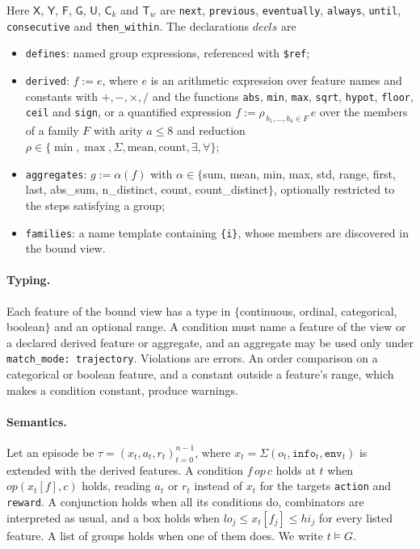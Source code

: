 \documentclass{article}
\begin{document}
Here $\mathsf{X}$, $\mathsf{Y}$, $\mathsf{F}$, $\mathsf{G}$, $\mathsf{U}$,
$\mathsf{C}_k$ and $\mathsf{T}_w$ are \texttt{next}, \texttt{previous},
\texttt{eventually}, \texttt{always}, \texttt{until}, \texttt{consecutive}
and \texttt{then\_within}. The declarations $\mathit{decls}$ are
\begin{itemize}
\item \texttt{defines}: named group expressions, referenced with \texttt{\$ref};
\item \texttt{derived}: $f := e$, where $e$ is an arithmetic expression
over feature names and constants with $+,-,\times,/$ and the functions
\texttt{abs}, \texttt{min}, \texttt{max}, \texttt{sqrt}, \texttt{hypot},
\texttt{floor}, \texttt{ceil} and \texttt{sign}, or a quantified
expression $f := \rho_{\,b_1,\dots,b_a\in F}\,e$ over the members of a
family $F$ with arity $a\le 8$ and reduction
$\rho\in\{\min,\max,\Sigma,\text{mean},\text{count},\exists,\forall\}$;
\item \texttt{aggregates}: $g := \alpha(f)$ with
$\alpha\in\{$sum, mean, min, max, std, range, first, last, abs\_sum,
n\_distinct, count, count\_distinct$\}$, optionally restricted to the
steps satisfying a group;
\item \texttt{families}: a name template containing \texttt{\{i\}}, whose
members are discovered in the bound view.
\end{itemize}

\paragraph{Typing.} Each feature of the bound view has a type in
$\{$continuous, ordinal, categorical, boolean$\}$ and an optional range.
A condition must name a feature of the view or a declared derived feature
or aggregate, and an aggregate may be used only under
\texttt{match\_mode: trajectory}. Violations are errors. An order
comparison on a categorical or boolean feature, and a constant outside a
feature's range, which makes a condition constant, produce warnings.

\paragraph{Semantics.} Let an episode be $\tau=(x_t,a_t,r_t)_{t=0}^{n-1}$,
where $x_t=\Sigma(o_t,\texttt{info}_t,\texttt{env}_t)$ is extended with
the derived features. A condition $f\,\mathit{op}\,c$ holds at $t$ when
$\mathit{op}(x_t[f],c)$ holds, reading $a_t$ or $r_t$ instead of $x_t$
for the targets \texttt{action} and \texttt{reward}. A conjunction holds
when all its conditions do, combinators are interpreted as usual, and a
box holds when $lo_j\le x_t[f_j]\le hi_j$ for every listed feature. A
list of groups holds when one of them does. We write $t\models G$.
\end{document}
